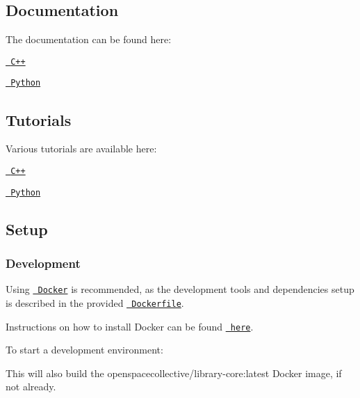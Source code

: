 \subsection*{Documentation}

The documentation can be found here\+:


\begin{DoxyItemize}
\item \href{https://open-space-collective.github.io/library-core}{\texttt{ C++}}
\item \href{./bindings/python/docs}{\texttt{ Python}}
\end{DoxyItemize}

\subsection*{Tutorials}

Various tutorials are available here\+:


\begin{DoxyItemize}
\item \href{./tutorials/cpp}{\texttt{ C++}}
\item \href{./tutorials/python}{\texttt{ Python}}
\end{DoxyItemize}

\subsection*{Setup}

\subsubsection*{Development}

Using \href{https://www.docker.com}{\texttt{ Docker}} is recommended, as the development tools and dependencies setup is described in the provided \href{./tools/development/docker/Dockerfile}{\texttt{ Dockerfile}}.

Instructions on how to install Docker can be found \href{https://docs.docker.com/install/}{\texttt{ here}}.

To start a development environment\+:


\begin{DoxyCode}{0}
\end{DoxyCode}


This will also build the {\ttfamily openspacecollective/library-\/core\+:latest} Docker image, if not already.

